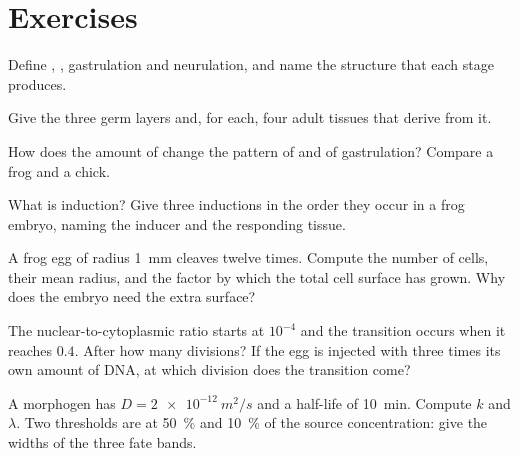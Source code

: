\section{Exercises}

\begin{exercise}[$\star$]\label{exo:b2:vertebrate-development:1}
Define , , gastrulation and neurulation, and name
the structure that each stage produces.
\end{exercise}

\begin{exercise}[$\star$]\label{exo:b2:vertebrate-development:2}
Give the three germ layers and, for each, four adult tissues that
derive from it.
\end{exercise}

\begin{exercise}[$\star$]\label{exo:b2:vertebrate-development:3}
How does the amount of  change the pattern of  and of
gastrulation? Compare a frog and a chick.
\end{exercise}

\begin{exercise}[$\star$]\label{exo:b2:vertebrate-development:4}
What is induction? Give three inductions in the order they occur in
a frog embryo, naming the inducer and the responding tissue.
\end{exercise}

\begin{exercise}[$\star\star$]\label{exo:b2:vertebrate-development:5}
A frog egg of radius \qty{1}{mm} cleaves twelve times. Compute the
number of cells, their mean radius, and the factor by which the
total cell surface has grown. Why does the embryo need the extra
surface?
\end{exercise}

\begin{exercise}[$\star\star$]\label{exo:b2:vertebrate-development:6}
The nuclear-to-cytoplasmic ratio starts at $10^{-4}$ and the
 transition occurs when it reaches $0.4$. After how many
divisions? If the egg is injected with three times its own amount
of DNA, at which division does the transition come?
\end{exercise}

\begin{exercise}[$\star\star$]\label{exo:b2:vertebrate-development:7}
A morphogen has $D = \qty{2e-12}{m^2/s}$ and a half-life of
\qty{10}{min}. Compute $k$ and $\lambda$. Two thresholds are at
\qty{50}{\%} and \qty{10}{\%} of the source concentration: give the
widths of the three fate bands.
\end{exercise}

